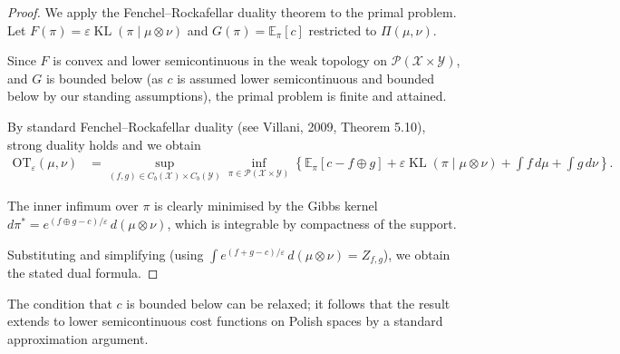 \begin{proof}
  We apply the Fenchel--Rockafellar duality theorem to the primal problem.
  Let $F(\pi) = \varepsilon \operatorname{KL}(\pi \mid \mu \otimes \nu)$ and
  $G(\pi) = \mathbb{E}_\pi[c]$ restricted to $\Pi(\mu, \nu)$.

  Since $F$ is convex and lower semicontinuous in the weak topology on
  $\mathcal{P}(\mathcal{X} \times \mathcal{Y})$, and $G$ is bounded below
  (as $c$ is assumed lower semicontinuous and bounded below by our standing assumptions),
  the primal problem is finite and attained.

  By standard Fenchel--Rockafellar duality (see Villani, 2009, Theorem 5.10), strong duality holds
  and we obtain
  \begin{align*}
    \mathrm{OT}_\varepsilon(\mu, \nu)
    &= \sup_{(f, g) \in C_b(\mathcal{X}) \times C_b(\mathcal{Y})}
       \inf_{\pi \in \mathcal{P}(\mathcal{X} \times \mathcal{Y})}
       \left\{
         \mathbb{E}_\pi[c - f \oplus g] + \varepsilon \operatorname{KL}(\pi \mid \mu \otimes \nu)
         + \int f \, d\mu + \int g \, d\nu
       \right\}.
  \end{align*}

  The inner infimum over $\pi$ is clearly minimised by the Gibbs kernel
  $d\pi^* = e^{(f \oplus g - c)/\varepsilon} \, d(\mu \otimes \nu)$,
  which is integrable by compactness of the support.

  Substituting and simplifying (using $\int e^{(f+g-c)/\varepsilon} \, d(\mu\otimes\nu) = Z_{f,g}$),
  we obtain the stated dual formula.
\end{proof}

\begin{remark}
  The condition that $c$ is bounded below can be relaxed; it follows that the result
  extends to lower semicontinuous cost functions on Polish spaces by a standard
  approximation argument.
\end{remark}
